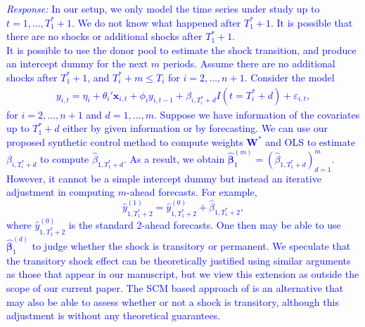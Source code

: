 \documentclass[12pt]{article}
\newcommand{\response}[1]{\noindent \textcolor{blue}{\emph{Response:} #1}}
\begin{document}
\response{In our setup, we only model the time series under study up to $t = 1, \ldots, T_1^*+1$.  We do not know what happened  after $T_1^*+1$. It is possible that there are no shocks or additional shocks after $T_1^*+1$. \\

It is possible to use the donor pool to estimate the shock transition,  and produce an intercept dummy for the next $m$ periods. Assume there are no additional shocks  after $T_1^*+1$, and $T_i^*+m \leq T_i$ for $i = 2, \ldots, n+1$. Consider the model
\begin{align*}
  y_{i,t} = \eta_i + \theta_i'\mathbf{x}_{i,t} + \phi_i y_{i,t-1 }+\beta_{i, T_i^* + d}I(t = T_i^*+d) +\varepsilon_{i,t},
\end{align*}
for $i = 2, \ldots, n+1$ and $d = 1, \ldots, m$. Suppose we have information of the covariates up to $T_1^*+d$ either by given information or by forecasting. We can use our proposed synthetic control method to compute weights $\mathbf{W}^*$ and OLS to estimate $\beta_{i, T_i^*+d}$ to compute $\hat{\beta}_{1, T_1^*+d}$.  As a result, we obtain $\hat{\boldsymbol{\beta}}_1^{(m)} = (\hat{\beta}_{1, T_1^*+d})_{d = 1}^m$. However, it cannot be a simple intercept dummy but instead an iterative adjustment in computing $m$-ahead forecasts. For example, 
$$
  \hat{y}_{1, T_1^*+2}^{(1)}=\hat{y}_{1, T_1^*+2}^{(0)} + \hat{\beta}_{1, T_1^*+2}, 
$$
where $\hat{y}_{1, T_1^*+2}^{(0)}$ is the standard 2-ahead forecasts. One then may be able to use $\hat{\boldsymbol{\beta}}_1^{(d)}$ to judge whether the shock is transitory or permanent. We speculate that the transitory shock effect can be theoretically justified using similar arguments as those that appear in our manuscript, but we view this extension as outside the scope of our current paper. The SCM based approach of \cite{agarwal2020two} is an alternative that may also be able to assess whether or not a shock is transitory, although this adjustment is without any theoretical guarantees. \\

} \\
\end{document}
